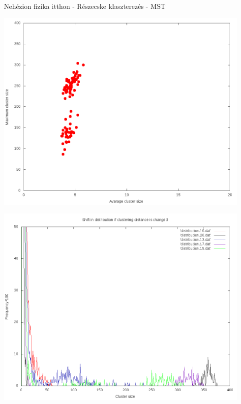 \documentclass[10pt]{beamer}
\begin{document}
\begin{frame}[t]{Nehézion fizika itthon - Részecske klaszterezés - MST}
\centering
\begin{minipage}{\textwidth}
\begin{minipage}{0.48\textwidth}
\centering
\includegraphics[width=0.94\textwidth]{../latex/mean-max18_120.png}
\end{minipage}
\begin{minipage}{0.48\textwidth}
\centering
\includegraphics[width=0.94\textwidth]{../latex/ShiftInDistro100.png}
\end{minipage}
\end{minipage}
\begin{minipage}{0.45\textwidth}

\end{minipage}
\end{frame}
\end{document}
